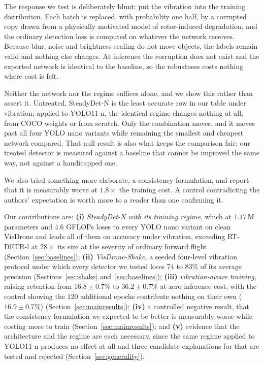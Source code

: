 The response we test is deliberately blunt: put the vibration into the training
distribution. Each batch is replaced, with probability one half, by a corrupted copy
drawn from a physically motivated model of rotor-induced degradation, and the
ordinary detection loss is computed on whatever the network receives. Because blur,
noise and brightness scaling do not move objects, the labels remain valid and
nothing else changes. At inference the corruption does not exist and the exported
network is identical to the baseline, so the robustness costs nothing where cost is
felt.

Neither the network nor the regime suffices alone, and we show this rather than
assert it. Untreated, SteadyDet-N is the least accurate row in our table under
vibration; applied to YOLO11-n, the identical regime changes nothing at all, from
COCO weights or from scratch. Only the combination moves, and it moves past all
four YOLO nano variants while remaining the smallest and cheapest network compared.
That null result is also what keeps the comparison fair: our treated detector is
measured against a baseline that cannot be improved the same way, not against a
handicapped one.

We also tried something more elaborate, a consistency formulation, and report that
it is measurably worse at $1.8\times$ the training cost. A control contradicting the
authors' expectation is worth more to a reader than one confirming it.

Our contributions are: \textbf{(i)} \emph{SteadyDet-N with its training regime},
which at $1.17$\,M parameters and $4.6$ GFLOPs loses to every YOLO nano variant on
clean VisDrone and leads all of them on accuracy under vibration, exceeding
RT-DETR-l at $28\times$ its size at the severity of ordinary forward flight
(Section~\ref{sec:baselines}); \textbf{(ii)} \emph{VisDrone-Shake}, a seeded
four-level vibration protocol under which every detector we tested loses
$74$ to $83\%$ of its average precision (Sections~\ref{sec:shake}
and~\ref{sec:baselines}); \textbf{(iii)} \emph{vibration-aware training}, raising
retention from $16.8 \pm 0.7\%$ to $36.2 \pm 0.7\%$ at zero inference cost, with
the control showing the $120$ additional epochs contribute nothing on their own
($16.9 \pm 0.7\%$) (Section~\ref{sec:mainresults}); \textbf{(iv)} a controlled
negative result, that the consistency formulation we expected to be better is
measurably worse while costing more to train (Section~\ref{sec:mainresults}); and
\textbf{(v)} evidence that the architecture and the regime are each necessary,
since the same regime applied to YOLO11-n produces no effect at all and three
candidate explanations for that are tested and rejected
(Section~\ref{sec:generality}).
